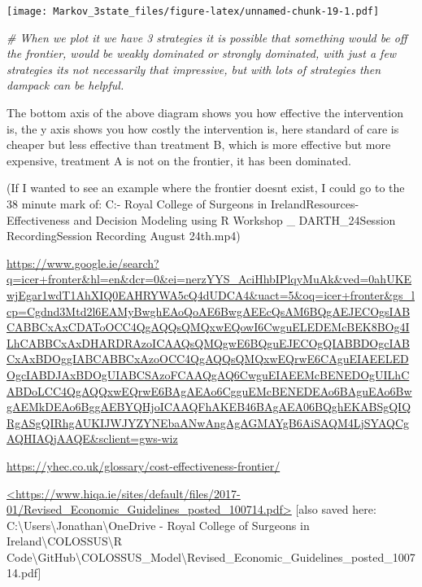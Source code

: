 \documentclass[
]{article}
\newenvironment{Shaded}{\begin{snugshade}}{\end{snugshade}}
\newcommand{\CommentTok}[1]{\textcolor[rgb]{0.56,0.35,0.01}{\textit{#1}}}
\begin{document}
\texttt{[image: Markov\_3state\_files/figure-latex/unnamed-chunk-19-1.pdf]}

\begin{Shaded}
\begin{Highlighting}[]
\CommentTok{\# When we plot it we have 3 strategies it is possible that something would be off the frontier, would be weakly dominated or strongly dominated, with just a few strategies it\textquotesingle{}s not necessarily that impressive, but with lots of strategies then dampack can be helpful.}
\end{Highlighting}
\end{Shaded}

The bottom axis of the above diagram shows you how effective the
intervention is, the y axis shows you how costly the intervention is,
here standard of care is cheaper but less effective than treatment B,
which is more effective but more expensive, treatment A is not on the
frontier, it has been dominated.

(If I wanted to see an example where the frontier doesnt exist, I could
go to the 38 minute mark of: C:\Users\Jonathan\OneDrive - Royal College
of Surgeons in Ireland\COLOSSUS\Training Resources\Cost-Effectiveness
and Decision Modeling using R Workshop \_ DARTH\August\_24\Live Session
Recording\Live Session Recording August 24th.mp4)

\url{https://www.google.ie/search?q=icer+fronter\&hl=en\&dcr=0\&ei=nerzYYS_AciHhbIPlqyMuAk\&ved=0ahUKEwjEgar1wdT1AhXIQ0EAHRYWA5cQ4dUDCA4\&uact=5\&oq=icer+fronter\&gs_lcp=Cgdnd3Mtd2l6EAMyBwghEAoQoAE6BwgAEEcQsAM6BQgAEJECOgsIABCABBCxAxCDAToOCC4QgAQQsQMQxwEQowI6CwguELEDEMcBEK8BOg4ILhCABBCxAxDHARDRAzoICAAQsQMQgwE6BQguEJECOgQIABBDOgcIABCxAxBDOggIABCABBCxAzoOCC4QgAQQsQMQxwEQrwE6CAguEIAEELEDOgcIABDJAxBDOgUIABCSAzoFCAAQgAQ6CwguEIAEEMcBENEDOgUILhCABDoLCC4QgAQQxwEQrwE6BAgAEAo6CgguEMcBENEDEAo6BAguEAo6BwgAEMkDEAo6BggAEBYQHjoICAAQFhAKEB46BAgAEA06BQghEKABSgQIQRgASgQIRhgAUKIJWJYZYNEbaANwAngAgAGMAYgB6AiSAQM4LjSYAQCgAQHIAQjAAQE\&sclient=gws-wiz}

\url{https://yhec.co.uk/glossary/cost-effectiveness-frontier/}

\href{https://www.hiqa.ie/sites/default/files/2017-01/Revised_Economic_Guidelines_posted_100714.pdf}{\textless https://www.hiqa.ie/sites/default/files/2017-01/Revised\_Economic\_Guidelines\_posted\_100714.pdf\textgreater{}}
{[}also saved here:
C:\textbackslash Users\textbackslash Jonathan\textbackslash OneDrive -
Royal College of Surgeons in
Ireland\textbackslash COLOSSUS\textbackslash R
Code\textbackslash GitHub\textbackslash COLOSSUS\_Model\textbackslash Revised\_Economic\_Guidelines\_posted\_100714.pdf{]}
\end{document}
